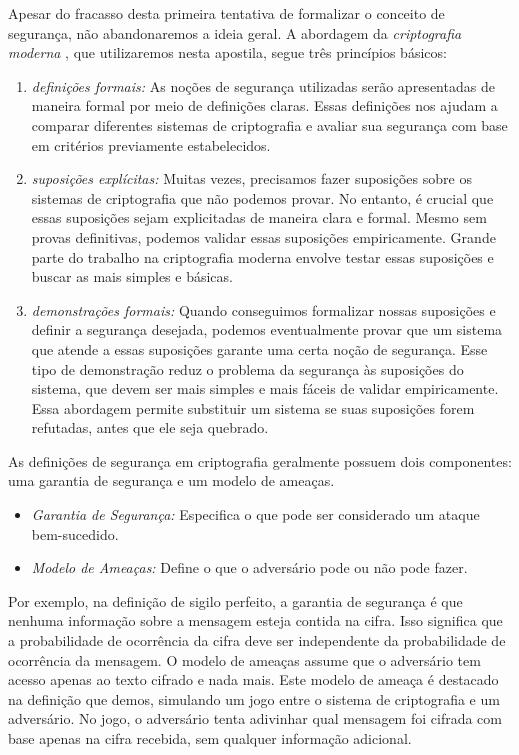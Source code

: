 Apesar do fracasso desta primeira tentativa de formalizar o conceito de segurança, não abandonaremos a ideia geral.
A abordagem da {\em criptografia moderna} \cite{Goldwasser84}, que utilizaremos nesta apostila, segue três princípios básicos:
\begin{enumerate}
\item {\em definições formais:}
  As noções de segurança utilizadas serão apresentadas de maneira formal por meio de definições claras.
  Essas definições nos ajudam a comparar diferentes sistemas de criptografia e avaliar sua segurança com base em critérios previamente estabelecidos.
\item {\em suposições explícitas:}
  Muitas vezes, precisamos fazer suposições sobre os sistemas de criptografia que não podemos provar.
  No entanto, é crucial que essas suposições sejam explicitadas de maneira clara e formal.
  Mesmo sem provas definitivas, podemos validar essas suposições empiricamente.
  Grande parte do trabalho na criptografia moderna envolve testar essas suposições e buscar as mais simples e básicas.
\item {\em demonstrações formais:}
  Quando conseguimos formalizar nossas suposições e definir a segurança desejada, podemos eventualmente provar que um sistema que atende a essas suposições garante uma certa noção de segurança.
  Esse tipo de demonstração reduz o problema da segurança às suposições do sistema, que devem ser mais simples e mais fáceis de validar empiricamente.
  Essa abordagem permite substituir um sistema se suas suposições forem refutadas, antes que ele seja quebrado.
\end{enumerate}

As definições de segurança em criptografia geralmente possuem dois componentes: uma garantia de segurança e um modelo de ameaças.
\begin{itemize}
\item {\em Garantia de Segurança:} Especifica o que pode ser considerado um ataque bem-sucedido.
\item {\em Modelo de Ameaças:} Define o que o adversário pode ou não pode fazer.
\end{itemize}

Por exemplo, na definição de sigilo perfeito, a garantia de segurança é que nenhuma informação sobre a mensagem esteja contida na cifra.
Isso significa que a probabilidade de ocorrência da cifra deve ser independente da probabilidade de ocorrência da mensagem.
O modelo de ameaças assume que o adversário tem acesso apenas ao texto cifrado e nada mais.
Este modelo de ameaça é destacado na definição que demos, simulando um jogo entre o sistema de criptografia e um adversário.
No jogo, o adversário tenta adivinhar qual mensagem foi cifrada com base apenas na cifra recebida, sem qualquer informação adicional.

